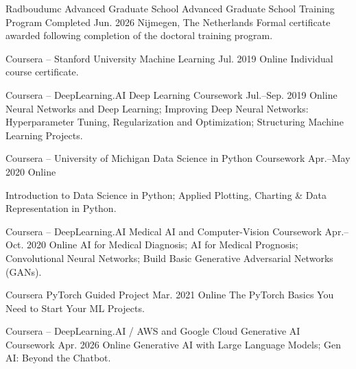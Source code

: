 
\begin{cventries}
\cventry
  {Radboudumc Advanced Graduate School}
  {Advanced Graduate School Training Program}
  {Completed Jun. 2026}
  {Nijmegen, The Netherlands}
  {Formal certificate awarded following completion of the doctoral training program.}

\cventry
  {Coursera -- Stanford University}
  {Machine Learning}
  {Jul. 2019}
  {Online}
  {Individual course certificate.}

\cventry
  {Coursera -- DeepLearning.AI}
  {Deep Learning Coursework}
  {Jul.--Sep. 2019}
  {Online}
  {Neural Networks and Deep Learning; Improving Deep Neural Networks: Hyperparameter Tuning, Regularization and Optimization; Structuring Machine Learning Projects.}

\cventry
  {Coursera -- University of Michigan}
  {Data Science in Python Coursework}
  {Apr.--May 2020}
  {Online}
  {
    \begin{cvitems}
      \item {Introduction to Data Science in Python; Applied Plotting, Charting \& Data Representation in Python.}
    \end{cvitems}
  }

\cventry
  {Coursera -- DeepLearning.AI}
  {Medical AI and Computer-Vision Coursework}
  {Apr.--Oct. 2020}
  {Online}
  {AI for Medical Diagnosis; AI for Medical Prognosis; Convolutional Neural Networks; Build Basic Generative Adversarial Networks (GANs).}

\cventry
  {Coursera}
  {PyTorch Guided Project}
  {Mar. 2021}
  {Online}
  {The PyTorch Basics You Need to Start Your ML Projects.}

\cventry
  {Coursera -- DeepLearning.AI / AWS and Google Cloud}
  {Generative AI Coursework}
  {Apr. 2026}
  {Online}
  {Generative AI with Large Language Models; Gen AI: Beyond the Chatbot.}
\end{cventries}

